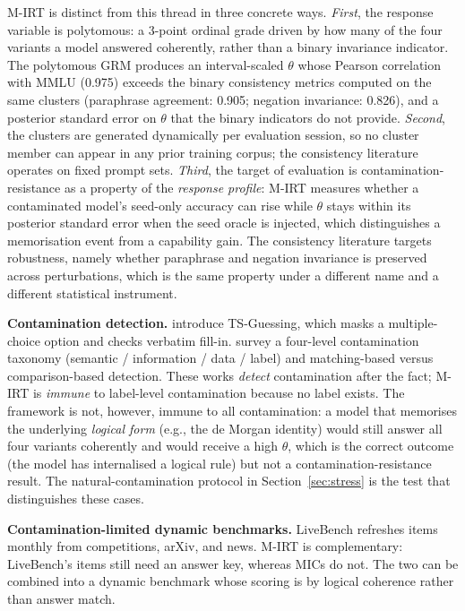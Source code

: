 \documentclass[11pt,letterpaper]{article}
\begin{document}
M-IRT is distinct from this thread in three concrete ways. \emph{First}, the response variable is polytomous: a 3-point ordinal grade driven by how many of the four variants a model answered coherently, rather than a binary invariance indicator. The polytomous GRM produces an interval-scaled $\theta$ whose Pearson correlation with MMLU (0.975) exceeds the binary consistency metrics computed on the same clusters (paraphrase agreement: 0.905; negation invariance: 0.826), and a posterior standard error on $\theta$ that the binary indicators do not provide. \emph{Second}, the clusters are generated dynamically per evaluation session, so no cluster member can appear in any prior training corpus; the consistency literature operates on fixed prompt sets. \emph{Third}, the target of evaluation is contamination-resistance as a property of the \emph{response profile}: M-IRT measures whether a contaminated model's seed-only accuracy can rise while $\theta$ stays within its posterior standard error when the seed oracle is injected, which distinguishes a memorisation event from a capability gain. The consistency literature targets robustness, namely whether paraphrase and negation invariance is preserved across perturbations, which is the same property under a different name and a different statistical instrument.

\textbf{Contamination detection.} \citet{Deng2023} introduce TS-Guessing, which masks a multiple-choice option and checks verbatim fill-in. \citet{Xu2024} survey a four-level contamination taxonomy (semantic / information / data / label) and matching-based versus comparison-based detection. These works \emph{detect} contamination after the fact; M-IRT is \emph{immune} to label-level contamination because no label exists. The framework is not, however, immune to all contamination: a model that memorises the underlying \emph{logical form} (e.g., the de Morgan identity) would still answer all four variants coherently and would receive a high $\theta$, which is the correct outcome (the model has internalised a logical rule) but not a contamination-resistance result. The natural-contamination protocol in Section~\ref{sec:stress} is the test that distinguishes these cases.

\textbf{Contamination-limited dynamic benchmarks.} LiveBench \citep{White2024} refreshes items monthly from competitions, arXiv, and news. M-IRT is complementary: LiveBench's items still need an answer key, whereas MICs do not. The two can be combined into a dynamic benchmark whose scoring is by logical coherence rather than answer match.
\end{document}
